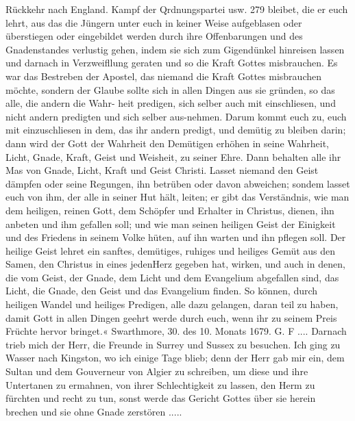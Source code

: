 Rückkehr nach England. Kampf der Qrdnungspartei usw. 279
bleibet, die er euch lehrt, aus das die Jüngern unter euch in
keiner Weise aufgeblasen oder überstiegen oder eingebildet werden
durch ihre Offenbarungen und des Gnadenstandes verlustig gehen,
indem sie sich zum Gigendünkel hinreisen lassen und darnach in
Verzweifllung geraten und so die Kraft Gottes misbrauchen.
Es war das Bestreben der Apostel, das niemand die Kraft
Gottes misbrauchen möchte, sondern der Glaube sollte sich in
allen Dingen aus sie gründen, so das alle, die andern die Wahr-
heit predigen, sich selber auch mit einschliesen, und nicht andern
predigten und sich selber aus-nehmen. Darum kommt euch zu,
euch mit einzuschliesen in dem, das ihr andern predigt, und demütig
zu bleiben darin; dann wird der Gott der Wahrheit den Demütigen
erhöhen in seine Wahrheit, Licht, Gnade, Kraft, Geist und
Weisheit, zu seiner Ehre. Dann behalten alle ihr Mas von
Gnade, Licht, Kraft und Geist Christi. Lasset niemand den Geist
dämpfen oder seine Regungen, ihn betrüben oder davon abweichen;
sondem lasset euch von ihm, der alle in seiner Hut hält, leiten;
er gibt das Verständnis, wie man dem heiligen, reinen Gott,
dem Schöpfer und Erhalter in Christus, dienen, ihn anbeten
und ihm gefallen soll; und wie man seinen heiligen Geist der
Einigkeit und des Friedens in seinem Volke hüten, auf ihn
warten und ihn pflegen soll. Der heilige Geist lehret ein sanftes,
demütiges, ruhiges und heiliges Gemüt aus den Samen, den
Christus in eines jedenHerz gegeben hat, wirken, und auch in denen,
die vom Geist, der Gnade, dem Licht und dem Evangelium abgefallen
sind, das Licht, die Gnade, den Geist und das Evangelium
finden. So können, durch heiligen Wandel und heiliges Predigen,
alle dazu gelangen, daran teil zu haben, damit Gott in allen
Dingen geehrt werde durch euch, wenn ihr zu seinem Preis
Früchte hervor bringet.«
Swarthmore, 30. des 10. Monats 1679. G. F ....
Darnach trieb mich der Herr, die Freunde in Surrey und
Sussex zu besuchen. Ich ging zu Wasser nach Kingston, wo ich
einige Tage blieb; denn der Herr gab mir ein, dem Sultan
und dem Gouverneur von Algier zu schreiben, um diese und
ihre Untertanen zu ermahnen, von ihrer Schlechtigkeit zu
lassen, den Herm zu fürchten und recht zu tun, sonst werde
das Gericht Gottes über sie herein brechen und sie ohne Gnade
zerstören .....

